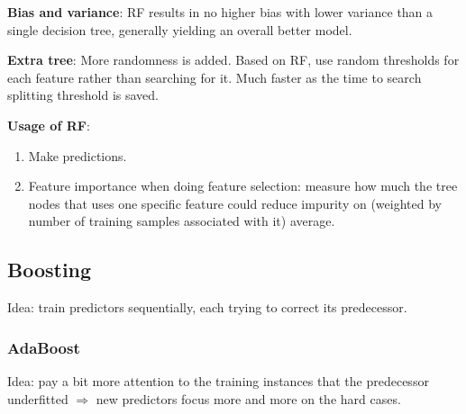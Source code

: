 \documentclass[12pt,oneside,a4paper]{article}
\numberwithin{equation}{section}
\begin{document}
\textbf{Bias and variance}: RF results in no higher bias with lower variance than a single decision tree, generally yielding an overall better model.

\textbf{Extra tree}: More randomness is added. Based on RF, use random thresholds for each feature rather than searching for it.  Much faster as the time to search splitting threshold is saved.

\textbf{Usage of RF}:
\begin{enumerate}
\item Make predictions. 
\item Feature importance when doing feature selection: measure how much the tree nodes that uses one specific feature could reduce impurity on (weighted by number of training samples associated with it) average. 
\end{enumerate}
\subsection{Boosting} 
Idea: train predictors sequentially, each trying to correct its predecessor. 

\subsubsection{AdaBoost}
Idea: pay a bit more attention to the training instances that the predecessor underfitted $\Rightarrow$ new predictors focus more and more on the hard cases. \\~\\
\end{document}

